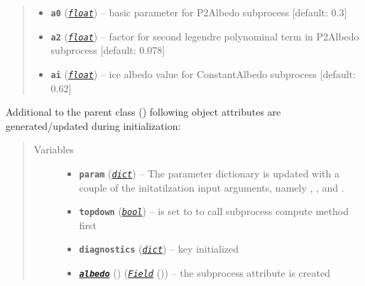 \documentclass[a4paper,10pt,english]{sphinxmanual}
\begin{document}
\begin{fulllineitems}
\begin{quote}
\begin{description}
\begin{itemize}
\begin{itemize}
\end{itemize}


\item {} 
\textbf{\texttt{a0}} (\href{http://docs.python.org/2.7/library/functions.html\#float}{\emph{\texttt{float}}}) -- basic parameter for P2Albedo subprocess {[}default: 0.3{]}

\item {} 
\textbf{\texttt{a2}} (\href{http://docs.python.org/2.7/library/functions.html\#float}{\emph{\texttt{float}}}) -- factor for second legendre polynominal term in P2Albedo
subprocess {[}default: 0.078{]}

\item {} 
\textbf{\texttt{ai}} (\href{http://docs.python.org/2.7/library/functions.html\#float}{\emph{\texttt{float}}}) -- ice albedo value for ConstantAlbedo subprocess
{[}default: 0.62{]}

\end{itemize}

\end{description}\end{quote}

Additional to the parent class 
{\hyperref[api/climlab.process:climlab.process.diagnostic.DiagnosticProcess]{\emph{}}} ()
following object attributes are generated/updated during initialization:
\begin{quote}\begin{description}
\item[{Variables}] \leavevmode\begin{itemize}
\item {} 
\textbf{\texttt{param}} (\href{http://docs.python.org/2.7/library/stdtypes.html\#dict}{\emph{\texttt{dict}}}) -- The parameter dictionary is updated with 
a couple of the initatilzation input 
arguments, namely , , 
 and .

\item {} 
\textbf{\texttt{topdown}} (\href{http://docs.python.org/2.7/library/functions.html\#bool}{\emph{\texttt{bool}}}) -- is set to  to call subprocess
compute method first

\item {} 
\textbf{\texttt{diagnostics}} (\href{http://docs.python.org/2.7/library/stdtypes.html\#dict}{\emph{\texttt{dict}}}) -- key  initialized

\item {} 
{\hyperref[api/climlab.surface:climlab.surface.albedo.P2Albedo.albedo]{\emph{\textbf{\texttt{albedo}}}}} () ({\hyperref[api/climlab.domain:climlab.domain.field.Field]{\emph{\emph{\texttt{Field}}}}} ()) -- the subprocess attribute  is
created


\end{itemize}
\end{description}
\end{quote}
\end{fulllineitems}
\end{document}
